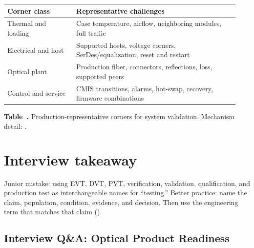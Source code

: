 \begin{table}[ht]
%
\centering
\setlength{\tabcolsep}{3pt}%
\footnotesize
\begin{tabular}{@{}p{0.28\linewidth}p{0.66\linewidth}@{}}
\toprule
Corner class & Representative challenges \\
\midrule
Thermal and loading & Case temperature, airflow, neighboring modules, full
traffic \\
\addlinespace[0.5em]
Electrical and host & Supported hosts, voltage corners, SerDes/equalization,
reset and restart \\
\addlinespace[0.5em]
Optical plant & Production fiber, connectors, reflections, loss, supported peers \\
\addlinespace[0.5em]
Control and service & CMIS transitions, alarms, hot-swap, recovery, firmware
combinations \\
\bottomrule
\end{tabular}
\par\medskip
{\raggedright\footnotesize\textbf{Table~\thetable.}\label{tab:prod-corners}
Production-representative corners for system validation. Mechanism detail:
.\par}
\end{table}

\section{Interview takeaway}
\label{sec:validation-design-review}


Junior mistake: using EVT, DVT, PVT, verification, validation, qualification,
and production test as interchangeable names for ``testing.'' Better practice:
name the claim, population, condition, evidence, and decision. Then use the
engineering term that matches that claim
().

\subsection{Interview Q\&A: Optical Product Readiness}
\label{sec:validation-interview-qa}

